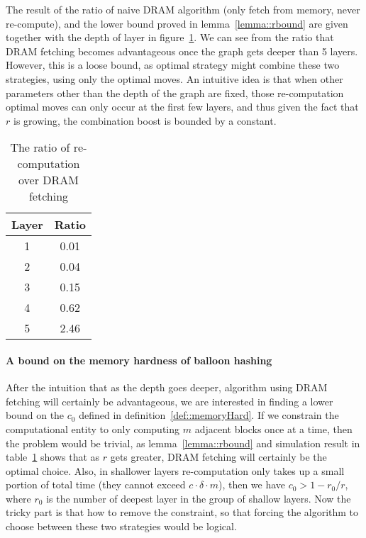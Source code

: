 The result of the ratio of naive DRAM algorithm (only fetch from memory, never re-compute), and
the lower bound proved in lemma~\ref{lemma::rbound} are given together with the depth of layer in
figure~\ref{table::recompDramRatio}. We can see from the ratio that DRAM fetching becomes advantageous once the
graph gets deeper than 5 layers. However, this is a loose bound, as optimal strategy might combine these two strategies,
using only the optimal moves. An intuitive idea is that when other parameters other than the depth of the graph are fixed,
those re-computation optimal moves can only occur at the first few layers, and thus given the fact that $r$ is growing,
the combination boost is bounded by a constant.

\begin{table}
  \centering
  \begin{tabular}{|c|c|}
     \hline
     Layer & Ratio \\ \hline
     1 & 0.01 \\
     2 & 0.04 \\
     3 & 0.15 \\
     4 & 0.62 \\
     5 & 2.46 \\
     \hline
  \end{tabular}
  \caption{The ratio of re-computation over DRAM fetching}\label{table::recompDramRatio}
\end{table}

\paragraph{A bound on the memory hardness of balloon hashing}
After the intuition that as the depth goes deeper, algorithm using DRAM fetching will certainly be advantageous, we are interested in
finding a lower bound on the $c_0$ defined in definition~\ref{def::memoryHard}. If we constrain the computational entity to only computing
$m$ adjacent blocks once at a time, then the problem would be trivial, as lemma~\ref{lemma::rbound} and simulation result in table~\ref{table::recompDramRatio}
shows that as $r$ gets greater, DRAM fetching will certainly be the optimal choice. Also, in shallower layers re-computation only takes up a
small portion of total time (they cannot exceed $c \cdot \delta \cdot m$), then we have $c_0 > 1 - r_0/r$, where $r_0$ is the number of deepest layer in
the group of shallow layers. Now the tricky part is that how to remove the constraint, so that forcing the algorithm to choose between these
two strategies would be logical.

